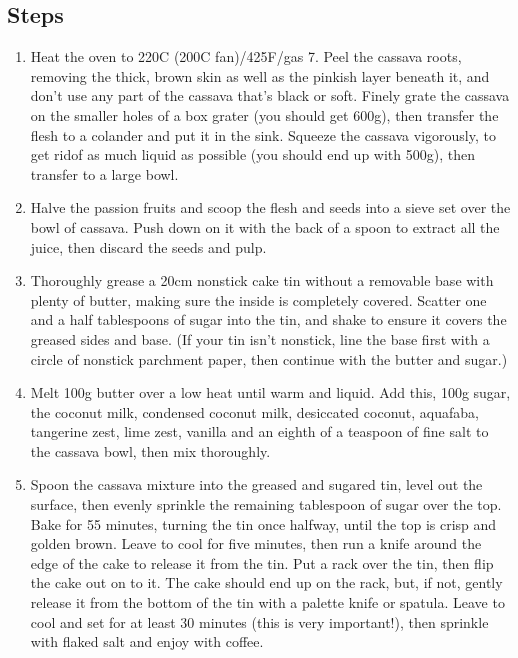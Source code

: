 \documentclass{book}
\begin{document}
\subsection*{Steps}
\begin{enumerate}
\item Heat the oven to 220C (200C fan)/425F/gas 7. Peel the cassava roots, removing the thick, brown skin as well as the pinkish layer beneath it, and don’t use any part of the cassava that’s black or soft. Finely grate the cassava on the smaller holes of a box grater (you should get 600g), then transfer the flesh to a colander and put it in the sink. Squeeze the cassava vigorously, to get ridof as much liquid as possible (you should end up with 500g), then transfer to a large bowl.
\item Halve the passion fruits and scoop the flesh and seeds into a sieve set over the bowl of cassava. Push down on it with the back of a spoon to extract all the juice, then discard the seeds and pulp.
\item Thoroughly grease a 20cm nonstick cake tin without a removable base with plenty of butter, making sure the inside is completely covered. Scatter one and a half tablespoons of sugar into the tin, and shake to ensure it covers the greased sides and base. (If your tin isn’t nonstick, line the base first with a circle of nonstick parchment paper, then continue with the butter and sugar.)
\item Melt 100g butter over a low heat until warm and liquid. Add this, 100g sugar, the coconut milk, condensed coconut milk, desiccated coconut, aquafaba, tangerine zest, lime zest, vanilla and an eighth of a teaspoon of fine salt to the cassava bowl, then mix thoroughly.
\item Spoon the cassava mixture into the greased and sugared tin, level out the surface, then evenly sprinkle the remaining tablespoon of sugar over the top. Bake for 55 minutes, turning the tin once halfway, until the top is crisp and golden brown. Leave to cool for five minutes, then run a knife around the edge of the cake to release it from the tin. Put a rack over the tin, then flip the cake out on to it. The cake should end up on the rack, but, if not, gently release it from the bottom of the tin with a palette knife or spatula. Leave to cool and set for at least 30 minutes (this is very important!), then sprinkle with flaked salt and enjoy with coffee.
\end{enumerate}
\newpage
\end{document}

